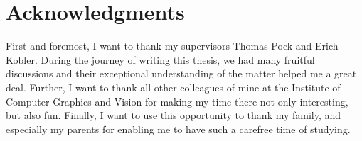 \chapter*{Acknowledgments}

First and foremost, I want to thank my supervisors Thomas Pock and Erich Kobler.
During the journey of writing this thesis, we had many fruitful discussions and their exceptional understanding of the matter helped me a great deal.
Further, I want to thank all other colleagues of mine at the Institute of Computer Graphics and Vision for making my time there not only interesting, but also fun.
Finally, I want to use this opportunity to thank my family, and especially my parents for enabling me to have such a carefree time of studying.
